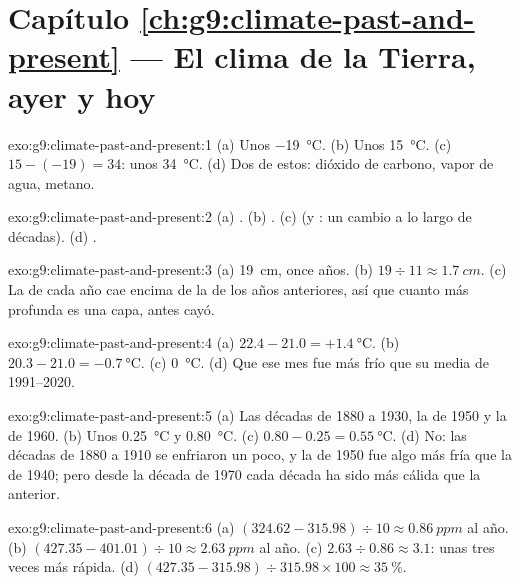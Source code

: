 \section*{Capítulo \ref{ch:g9:climate-past-and-present} --- El clima de la Tierra, ayer y hoy}

\begin{solution}{exo:g9:climate-past-and-present:1}
(a) Unos \qty{-19}{\degreeCelsius}. (b) Unos \qty{15}{\degreeCelsius}.
(c) $15 - (-19) = 34$: unos \qty{34}{\degreeCelsius}. (d) Dos de estos:
dióxido de carbono, vapor de agua, metano.
\end{solution}

\begin{solution}{exo:g9:climate-past-and-present:2}
(a) . (b) . (c)  (y : un cambio a lo largo
de décadas). (d) .
\end{solution}

\begin{solution}{exo:g9:climate-past-and-present:3}
(a) \qty{19}{cm}, once años. (b) $19 \div 11 \approx \qty{1.7}{cm}$.
(c) La  de cada año cae encima de la  de los años anteriores, así
que cuanto más profunda es una capa, antes cayó.
\end{solution}

\begin{solution}{exo:g9:climate-past-and-present:4}
(a) $22.4 - 21.0 = +\qty{1.4}{\degreeCelsius}$. (b) $20.3 - 21.0 =
\qty{-0.7}{\degreeCelsius}$. (c) \qty{0}{\degreeCelsius}. (d) Que ese mes
fue más frío que su media de 1991--2020.
\end{solution}

\begin{solution}{exo:g9:climate-past-and-present:5}
(a) Las décadas de 1880 a 1930, la de 1950 y la de 1960. (b) Unos
\qty{0.25}{\degreeCelsius} y \qty{0.80}{\degreeCelsius}. (c) $0.80 -
0.25 = \qty{0.55}{\degreeCelsius}$. (d) No: las décadas de 1880 a 1910 se
enfriaron un poco, y la de 1950 fue algo más fría que la de 1940; pero
desde la década de 1970 cada década ha sido más cálida que la anterior.
\end{solution}

\begin{solution}{exo:g9:climate-past-and-present:6}
(a) $(324.62 - 315.98) \div 10 \approx \qty{0.86}{ppm}$ al año. (b)
$(427.35 - 401.01) \div 10 \approx \qty{2.63}{ppm}$ al año. (c) $2.63
\div 0.86 \approx 3.1$: unas tres veces más rápida. (d) $(427.35 - 315.98)
\div 315.98 \times 100 \approx 35~\%$.
\end{solution}

